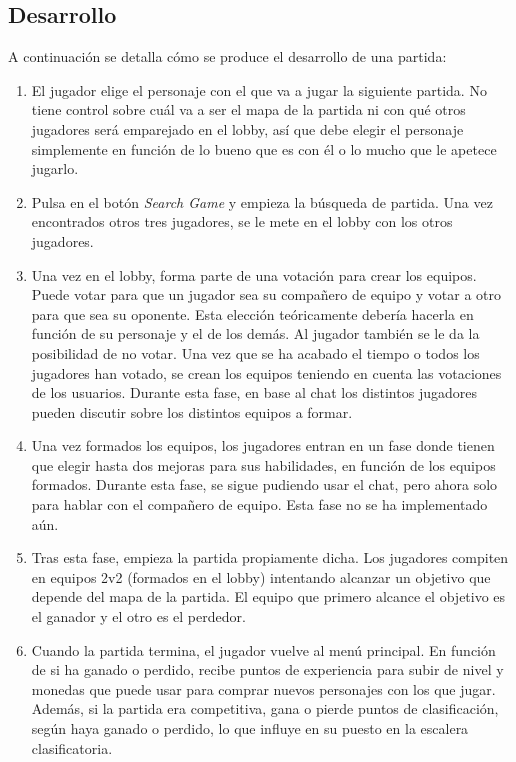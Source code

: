 \subsection{Desarrollo}

A continuación se detalla cómo se produce el desarrollo de una partida:
\begin{enumerate}
   \item El jugador elige el personaje con el que va a jugar la siguiente partida. No tiene control sobre cuál va a ser el mapa de la partida ni con qué otros jugadores será emparejado en el lobby, así que debe elegir el personaje simplemente en función de lo bueno que es con él o lo mucho que le apetece jugarlo.
   \item Pulsa en el botón \emph{Search Game} y empieza la búsqueda de partida. Una vez encontrados otros tres jugadores, se le mete en el lobby con los otros jugadores.
   \item Una vez en el lobby, forma parte de una votación para crear los equipos. Puede votar para que un jugador sea su compañero de equipo y votar a otro para que sea su oponente. Esta elección teóricamente debería hacerla en función de su personaje y el de los demás. Al jugador también se le da la posibilidad de no votar. Una vez que se ha acabado el tiempo o todos los jugadores han votado, se crean los equipos teniendo en cuenta las votaciones de los usuarios. Durante esta fase, en base al chat los distintos jugadores pueden discutir sobre los distintos equipos a formar.
   \item Una vez formados los equipos, los jugadores entran en un fase donde tienen que elegir hasta dos mejoras para sus habilidades, en función de los equipos formados. Durante esta fase, se sigue pudiendo usar el chat, pero ahora solo para hablar con el compañero de equipo. Esta fase no se ha implementado aún.
   \item Tras esta fase, empieza la partida propiamente dicha. Los jugadores compiten en equipos 2v2 (formados en el lobby) intentando alcanzar un objetivo que depende del mapa de la partida. El equipo que primero alcance el objetivo es el ganador y el otro es el perdedor.
   \item Cuando la partida termina, el jugador vuelve al menú principal. En función de si ha ganado o perdido, recibe puntos de experiencia para subir de nivel y monedas que puede usar para comprar nuevos personajes con los que jugar. Además, si la partida era competitiva, gana o pierde puntos de clasificación, según haya ganado o perdido, lo que influye en su puesto en la escalera clasificatoria.
\end{enumerate}

